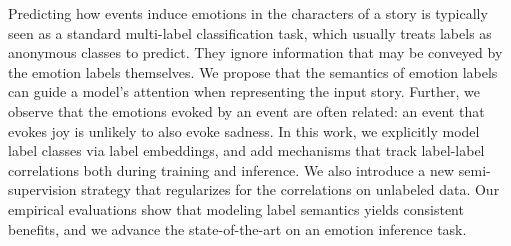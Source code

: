 Predicting how events induce emotions in the characters of a story is typically seen as a standard multi-label classification task, which usually treats labels as anonymous classes to predict. They ignore information that may be conveyed by the emotion labels themselves. We propose that the semantics of emotion labels can guide a model's attention when representing the input story. Further, we observe that the emotions evoked by an event are often related: an event that evokes joy is unlikely to also evoke sadness. In this work, we explicitly model label classes via label embeddings, and add mechanisms that track label-label correlations both during training and inference. We also introduce a new semi-supervision strategy that regularizes for the correlations on unlabeled data. Our empirical evaluations show that modeling label semantics yields consistent benefits, and we advance the state-of-the-art on an emotion inference task.
